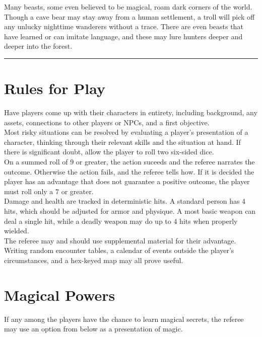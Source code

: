 \documentclass[a4paper]{article}
\begin{document}
\begin{multicols}{2}
Many beasts, some even believed to be magical, roam dark corners of the world. Though a cave bear may stay away from a human settlement, a troll will pick off any unlucky nighttime wanderers without a trace. There are even beasts that have learned or can imitate language, and these may lure hunters deeper and deeper into the forest. \\

\hrule

\appendix
\section{Rules for Play}

Have players come up with their characters in entirety, including background, any assets, connections to other players or NPCs, and a first objective. \\

Most risky situations can be resolved by evaluating a player's presentation of a character, thinking through their relevant skills and the situation at hand. If there is significant doubt, allow the player to roll two six-sided dice. \\

On a summed roll of 9 or greater, the action suceeds and the referee narrates the outcome. Otherwise the action fails, and the referee tells how. If it is decided the player has an advantage that does not guarantee a positive outcome, the player must roll only a 7 or greater. \\

Damage and health are tracked in deterministic hits. A standard person has 4 hits, which should be adjusted for armor and physique. A most basic weapon can deal a single hit, while a deadly weapon may do up to 4 hits when properly wielded. \\

The referee may and should use supplemental material for their advantage. Writing random encounter tables, a calendar of events outside the player's circumstances, and a hex-keyed map may all prove useful.

\section{Magical Powers}

If any among the players have the chance to learn magical secrets, the referee may use an option from below as a presentation of magic.


\end{multicols}
\end{document}
